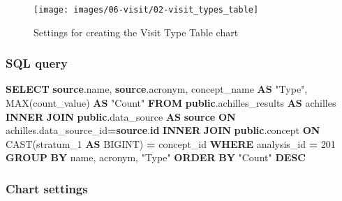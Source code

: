 \documentclass[
]{book}
\newenvironment{Shaded}{\begin{snugshade}}{\end{snugshade}}
\newcommand{\DecValTok}[1]{\textcolor[rgb]{0.00,0.00,0.81}{#1}}
\newcommand{\FunctionTok}[1]{\textcolor[rgb]{0.00,0.00,0.00}{#1}}
\newcommand{\KeywordTok}[1]{\textcolor[rgb]{0.13,0.29,0.53}{\textbf{#1}}}
\newcommand{\NormalTok}[1]{#1}
\newcommand{\OperatorTok}[1]{\textcolor[rgb]{0.81,0.36,0.00}{\textbf{#1}}}
\newcommand{\OtherTok}[1]{\textcolor[rgb]{0.56,0.35,0.01}{#1}}
\begin{document}
\begin{figure}
\texttt{[image: images/06-visit/02-visit\_types\_table]} \caption{Settings for creating the Visit Type Table chart}\label{fig:visitTypeTable}
\end{figure}

\hypertarget{sql-query-24}{%
\subsubsection*{SQL query}\label{sql-query-24}}

\begin{Shaded}
\begin{Highlighting}[]
\KeywordTok{SELECT} \KeywordTok{source}\NormalTok{.name,}
       \KeywordTok{source}\NormalTok{.acronym,}
\NormalTok{       concept\_name }\KeywordTok{AS} \OtherTok{"Type"}\NormalTok{,}
       \FunctionTok{MAX}\NormalTok{(count\_value) }\KeywordTok{AS} \OtherTok{"Count"}
\KeywordTok{FROM} \KeywordTok{public}\NormalTok{.achilles\_results }\KeywordTok{AS}\NormalTok{ achilles}
\KeywordTok{INNER} \KeywordTok{JOIN} \KeywordTok{public}\NormalTok{.data\_source }\KeywordTok{AS} \KeywordTok{source} \KeywordTok{ON}\NormalTok{ achilles.data\_source\_id}\OperatorTok{=}\KeywordTok{source}\NormalTok{.}\KeywordTok{id}
\KeywordTok{INNER} \KeywordTok{JOIN} \KeywordTok{public}\NormalTok{.concept }\KeywordTok{ON} \FunctionTok{CAST}\NormalTok{(stratum\_1 }\KeywordTok{AS}\NormalTok{ BIGINT) }\OperatorTok{=}\NormalTok{ concept\_id}
\KeywordTok{WHERE}\NormalTok{ analysis\_id }\OperatorTok{=} \DecValTok{201}
\KeywordTok{GROUP} \KeywordTok{BY}\NormalTok{ name, acronym, }\OtherTok{"Type"}
\KeywordTok{ORDER} \KeywordTok{BY} \OtherTok{"Count"} \KeywordTok{DESC}
\end{Highlighting}
\end{Shaded}

\hypertarget{chart-settings-26}{%
\subsubsection*{Chart settings}\label{chart-settings-26}}
\end{document}
